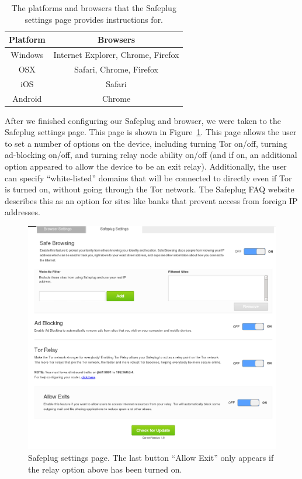 \documentclass[letterpaper,twocolumn,10pt]{article}
\begin{document}
\begin{table}[!t]
\renewcommand{\arraystretch}{1.3}
\caption{The platforms and browsers that the Safeplug settings page provides instructions for.}
\label{table_example}
\centering
	\begin{tabular}{|c|c|}
	\hline
		Platform & Browsers \\ \hline
		Windows	& Internet Explorer, Chrome, Firefox \\ \hline
		OSX & Safari, Chrome, Firefox \\ \hline
		iOS	& Safari \\ \hline
		Android	& Chrome \\ \hline
	\end{tabular}
\end{table}

After we finished configuring our Safeplug and browser, we were taken to the Safeplug settings page.  This page is shown in Figure~\ref{fig:settings}.  This page allows the user to set a number of options on the device, including turning Tor on/off, turning ad-blocking on/off, and turning relay node ability on/off (and if on, an additional option appeared to allow the device to be an exit relay).  Additionally, the user can specify ``white-listed'' domains that will be connected to directly even if Tor is turned on, without going through the Tor network.  The Safeplug FAQ website describes this as an option for sites like banks that prevent access from foreign IP addresses\cite{safeplug}.

\begin{figure}
  \centering
  \includegraphics[width=.65\textwidth]{settings_with_exit}
  \caption{Safeplug settings page.  The last button ``Allow Exit'' only appears if the relay option above has been turned on.}
  \label{fig:settings}
\end{figure}
\end{document}
